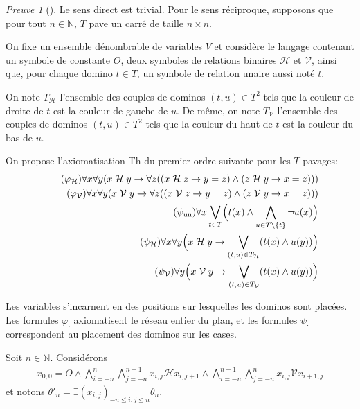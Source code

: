 \documentclass{scrartcl}
\renewcommand{\le}{\leqslant}
\newcommand{\N}{\mathbb N}
\renewcommand{\H}{\mathrel{\mathcal H}}
\newcommand{\V}{\mathrel{\mathcal V}}
\theoremstyle{definition}
\theoremstyle{remark}
\newtheorem{preuve}{Preuve}
\begin{document}
\begin{preuve}[]
  Le sens direct est trivial. Pour le sens réciproque, supposons que pour tout $n\in\N$, $T$ pave un carré de taille $n\times n$.

  On fixe un ensemble dénombrable de variables $V$ et considère le langage contenant un symbole de constante $O$, deux symboles de relations binaires $\mathcal H$ et $\mathcal V$, ainsi que, pour chaque domino $t\in T$, un symbole de relation unaire aussi noté $t$.
  
  On note $T_{\mathcal H}$ l'ensemble des couples de dominos $(t,u)\in T^2$ tels que la couleur de droite de $t$ est la couleur de gauche de $u$. De même, on note $T_{\mathcal V}$ l'ensemble des couples de dominos $(t,u)\in T^2$ tels que la couleur du haut de $t$ est la couleur du bas de $u$.

  On propose l'axiomatisation $\mathrm{Th}$ du premier ordre suivante pour les $T$-pavages:
  \begin{align}
    \tag{$\varphi_{\mathcal H}$}
    \forall x\forall y (x\H y\rightarrow\forall z((x\H z\rightarrow y=z)\land (z\H y\rightarrow x=z)))\\
    \tag{$\varphi_{\mathcal V}$}
    \forall x\forall y (x\V y\rightarrow\forall z((x\V z\rightarrow y=z) \land (z\V y\rightarrow x=z)))\\
    \tag{$\psi_{\mathrm{un}}$}
    \forall x\bigvee_{t\in T}\Bigl(t(x)\land\bigwedge_{u\in T\setminus\{t\}}\lnot u(x)\Bigr)\\
    \tag{$\psi_{\mathcal H}$}
    \forall x\forall y \Bigl( x\H y \rightarrow \bigvee_{(t,u)\in T_{\mathcal H}}(t(x)\land u(y))\Bigr)\\
    \tag{$\psi_{\mathcal V}$}
    \forall y \Bigl( x\V y \rightarrow \bigvee_{(t,u)\in T_{\mathcal V}}(t(x)\land u(y))\Bigr)
  \end{align}

  Les variables s'incarnent en des positions sur lesquelles les dominos sont placées. Les formules $\varphi_\cdot$ axiomatisent le réseau entier du plan, et les formules $\psi_\cdot$ correspondent au placement des dominos sur les cases.

  Soit $n\in\N$. Considérons
  \begin{align}
    \tag{$\theta_n$}
    x_{0,0}=O\land\bigwedge_{i=-n}^n\bigwedge_{j=-n}^{n-1} x_{i,j}\H x_{i,j+1}\land \bigwedge_{i=-n}^{n-1}\bigwedge_{j=-n}^n x_{i,j}\V x_{i+1,j}
  \end{align}
  et notons $\theta'_n=\exists(x_{i,j})_{-n\le i,j\le n}\theta_n$.


\end{preuve}
\end{document}
